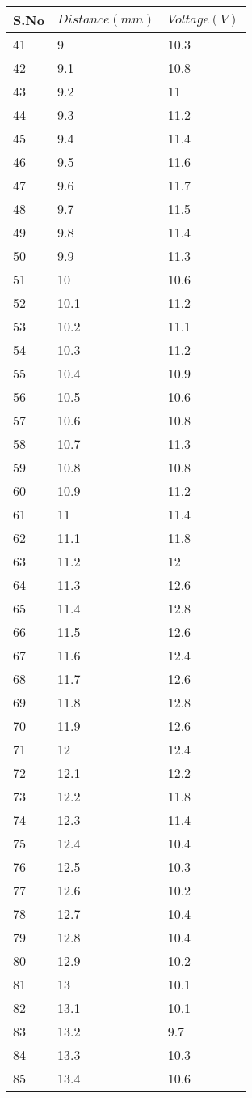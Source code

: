 \documentclass[
	letterpaper, %
	10pt, %
]{CSUniSchoolLabReport}
\begin{document}
\begin{center}
	\begin{tabular}{ | m{1cm} | m{3cm}| m{3cm} | } 
		\hline
		S.No	&	\(Distance (mm)\)	&	\(Voltage (V)\) \\
		\hline

41&9&10.3\\
42&9.1&10.8\\
43&9.2&11\\
44&9.3&11.2\\
45&9.4&11.4\\
46&9.5&11.6\\
47&9.6&11.7\\
48&9.7&11.5\\
49&9.8&11.4\\
50&9.9&11.3\\
51&10&10.6\\
52&10.1&11.2\\
53&10.2&11.1\\
54&10.3&11.2\\
55&10.4&10.9\\
56&10.5&10.6\\
57&10.6&10.8\\
58&10.7&11.3\\
59&10.8&10.8\\
60&10.9&11.2\\
61&11&11.4\\
62&11.1&11.8\\
63&11.2&12\\
64&11.3&12.6\\
65&11.4&12.8\\
66&11.5&12.6\\
67&11.6&12.4\\
68&11.7&12.6\\
69&11.8&12.8\\
70&11.9&12.6\\
71&12&12.4\\
72&12.1&12.2\\
73&12.2&11.8\\
74&12.3&11.4\\
75&12.4&10.4\\
76&12.5&10.3\\
77&12.6&10.2\\
78&12.7&10.4\\
79&12.8&10.4\\
80&12.9&10.2\\
81&13&10.1\\
82&13.1&10.1\\
83&13.2&9.7\\
84&13.3&10.3\\
85&13.4&10.6\\
\hline
	\end{tabular}
\end{center}
\end{document}
